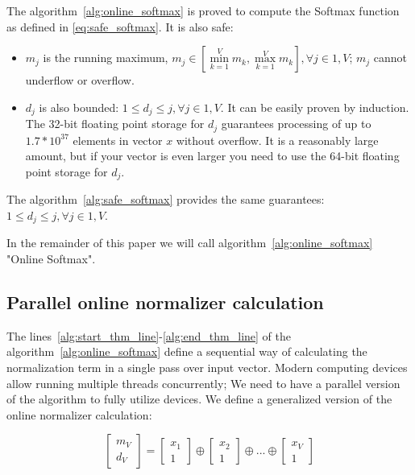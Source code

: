 \documentclass{article}
\DeclareMathOperator{\normRed}{\oplus}
\begin{document}
The algorithm~\ref{alg:online_softmax} is proved to compute the Softmax function as defined in \eqref{eq:safe_softmax}. It is also safe:
\begin{itemize}
\item $m_j$ is the running maximum, $m_j \in \left[\min\limits_{k=1}^{V}{m_k},\max\limits_{k=1}^{V}{m_k}\right], \forall j\in 1,V$; $m_j$ cannot underflow or overflow.
\item $d_j$ is also bounded: $1 \leq d_j \leq j, \forall j\in 1,V$. It can be easily proven by induction. The 32-bit floating point storage for $d_j$ guarantees processing of up to $1.7*10^{37}$ elements in vector $x$ without overflow. It is a reasonably large amount, but if your vector is even larger you need to use the 64-bit floating point storage for $d_j$.
\end{itemize}

The algorithm~\ref{alg:safe_softmax} provides the same guarantees: $1 \leq d_j \leq j, \forall j\in 1,V$. 

In the remainder of this paper we will call algorithm~\ref{alg:online_softmax} "Online Softmax".

\subsection{Parallel online normalizer calculation}

The lines~\ref{alg:start_thm_line}-\ref{alg:end_thm_line} of the algorithm~\ref{alg:online_softmax} define a sequential way of calculating the normalization term in a single pass over input vector. Modern computing devices allow running multiple threads concurrently; We need to have a parallel version of the algorithm to fully utilize devices. We define a generalized version of the online normalizer calculation:

\begin{equation}
\label{eq:generalized_online}
\begin{bmatrix}m_V\\d_V\end{bmatrix} = \begin{bmatrix}x_1\\1\end{bmatrix}\normRed\begin{bmatrix}x_2\\1\end{bmatrix}\normRed ...\normRed\begin{bmatrix}x_V\\1\end{bmatrix}
\end{equation}
\end{document}
